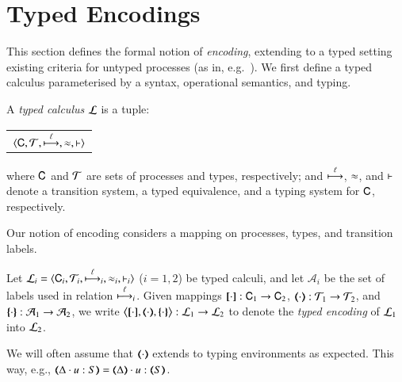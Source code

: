
\section{Typed Encodings}
\label{s:expr}
\label{sec:enc}

This section defines the formal notion of \emph{encoding}, 
extending to a typed setting existing criteria for untyped processes (as in,
e.g.~\cite{Nestmann00,Palamidessi03,DBLP:conf/lics/PalamidessiSVV06,DBLP:journals/iandc/Gorla10,DBLP:conf/icalp/LanesePSS10,DBLP:journals/corr/abs-1208-2750}). 
We first define a typed calculus parameterised by a syntax, operational semantics, and typing.

\begin{definition}\myrm
	\label{d:tcalculus}
	A \emph{typed calculus} $\mathcal{L}$ is a tuple:
	\begin{center}
		\begin{tabular}{c}
			$\langle \mathsf{C}, \cal{T}, \stackrel{\ell}{\longmapsto}, \approx, \vdash \rangle$
		\end{tabular}
	\end{center}
	\noi where $\mathsf{C}$ and $\cal{T}$ are sets of processes and types, 
	respectively; and $\stackrel{\ell}{\longmapsto}$, $\approx$, and $\vdash$ 
	denote a transition system, a typed equivalence, and a typing system for $\mathsf{C}$, respectively. 
\end{definition}

\noi Our notion of encoding considers a mapping on processes, 
types, and transition labels.  

\begin{definition}\myrm
        Let  $\mathcal{L}_i=\langle \mathsf{C}_i, {\cal{T}}_i, {\stackrel{\ell}{\longmapsto}}_i, \approx_i, \vdash_i \rangle$
        ($i=1,2$) be typed calculi, and let $\mathcal{A}_i$ be the
	set of labels used in relation ${\stackrel{\ell}{\longmapsto}}_i$.
	Given mappings $[\!\![\cdot]\!\!]: \mathsf{C}_1 \to \mathsf{C}_2$, 
	$(\!\!\langle\cdot\rangle\!\!): {\cal{T}}_1 \to {\cal{T}}_2$, and 
	$\{\!\!\{\cdot\}\!\!\}: \mathcal{A}_1 \to \mathcal{A}_2$, 
	we write 
	$\enco{\map{\cdot}, \mapt{\cdot}, \mapa{\cdot}} : \tyl{L}_1 \to \tyl{L}_2$ to denote the \emph{typed encoding} of $\mathcal{L}_1$ into $\mathcal{L}_2$.
\end{definition}

\noi We will often assume that  $(\!\!\langle\cdot\rangle\!\!)$ extends to typing
environments as expected. This way, e.g., $\mapt{\Delta \cat u:S} = \mapt{\Delta} \cat u:\mapt{S}$.

